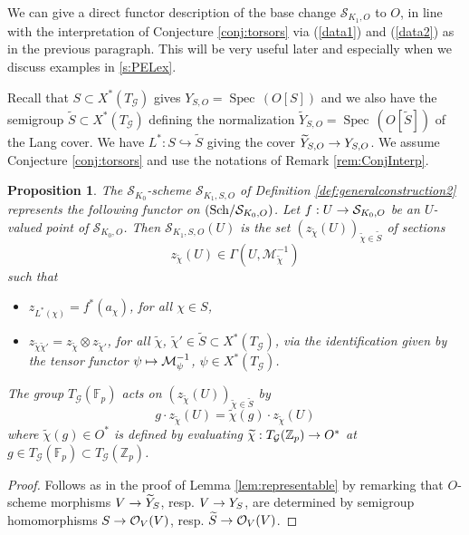 \documentclass[reqno, 10pt]{amsart}
\makeatletter
\newcommand{\BF}{\ensuremath{\mathbb {F}}\xspace}
\newcommand{\BZ}{\ensuremath{\mathbb {Z}}\xspace}
\newcommand{\CG}{\ensuremath{\mathcal {G}}\xspace}
\newcommand{\CM}{\ensuremath{\mathcal {M}}\xspace}
\newcommand{\CO}{\ensuremath{\mathcal {O}}\xspace}
\newcommand{\CS}{\ensuremath{\mathcal {S}}\xspace}
\DeclareMathOperator{\Spec}{Spec\,}
\newcommand{\wt}{\widetilde}
\newtheorem{proposition}[subsubsection]{Proposition}
\theoremstyle{definition}
\numberwithin{equation}{subsection}
\numberwithin{subsubsection}{subsection}
\renewcommand{\to}{%
   \ifbool{@display}{\longrightarrow}{\rightarrow}%
   }
\let\shortmapsto\mapsto
\renewcommand{\mapsto}{%
   \ifbool{@display}{\shortmapsto}{\shortmapsto}%
   }
\makeatother
\begin{document}
We can give a direct functor description of the base change $\CS_{K_1, O}$ to $O$, in  line with the interpretation of Conjecture  \ref{conj:torsors}  via (\ref{data1}) and (\ref{data2}) as in the previous paragraph.  This will be very useful later and especially when we discuss examples in \ref{s:PELex}.  

Recall that  $S\subset X^*(T_\CG)$ gives $Y_{S,O}=\Spec(O[S])$ and we also have the semigroup $\wt S \subset X^*(T_\CG)$ defining the normalization $\wt Y_{S, O}=\Spec(O[\wt S])$ of the Lang cover. We have $L^*: S\hookrightarrow \wt S$ giving the cover $\wt Y_{S,O}\to Y_{S, O}$. 
 We assume Conjecture  \ref{conj:torsors} and use the notations of Remark \ref{rem:ConjInterp}.
  




 \begin{proposition}\label{def:generalconstruction}  The $\CS_{K_0}$-scheme $\CS_{K_1,S, O}$ of Definition \ref{def:generalconstruction2} represents the following functor on $({\rm Sch}/\CS_{K_0,O})$. Let $f: U\to \CS_{K_0, O}$ be an $U$-valued point of $\CS_{K_0,O}$. Then $\CS_{K_1,S, O}(U)$ is   the set   $(z_{\wt\chi}(U))_{\wt\chi\in \wt S}$
 of sections 
 \[
 z_{\wt \chi}(U)\in \Gamma(U,  \CM^{-1}_{\wt \chi})
 \] 
such that
  \begin{itemize}
  \item[i)] $z_{L^*(\chi)}=f^*(a_\chi)$, for all $\chi\in S$,
  \item[ii)] $ z_{\wt\chi\wt\chi'}=z_{\wt \chi}\otimes z_{\wt \chi'}$, for all $\wt \chi$, $\wt \chi'\in \wt S\subset X^*(T_\CG)$, via the identification given by the tensor functor $\psi\mapsto \CM^{-1}_{\psi}$, $\psi\in X^*(T_\CG)$.
\end{itemize}
The group $T_\CG(\BF_p)$ acts on $(z_{\wt\chi}(U))_{\wt\chi\in \wt S}$ by
\[
g\cdot z_{\wt\chi}(U)=\wt\chi(g)\cdot z_{\wt\chi}(U) 
\]
where   $\wt\chi(g)\in O^*$ is defined by evaluating $\wt\chi: T_{\CG}(\BZ_p)\to O^*$ at $g\in T_\CG(\BF_p)\subset T_\CG(\BZ_p)$.
 \end{proposition}
 
 \begin{proof}
 Follows as in the proof of Lemma \ref{lem:representable} by remarking that $O$-scheme morphisms $V\to \wt Y_S$, resp. $V\to Y_S$, are determined by semigroup homomorphisms
 $S\to \CO_V(V)$, resp.  $\wt S\to \CO_V(V)$.
  \end{proof}
 
\end{document}
